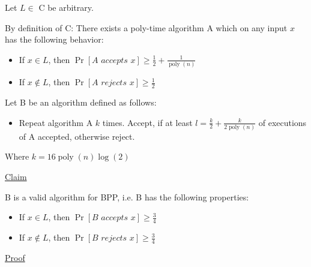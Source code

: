 Let $L \in$ C be arbitrary.

By definition of C: There exists a poly-time algorithm A which on any input $x$ has the following behavior:

\begin{itemize}
    \item If $x \in L$, then $\operatorname{Pr}[\textit{A accepts } x] \geq \frac{1}{2} + \frac{1}{\operatorname{poly}(n)}$
    
    \item If $x \notin L$, then $\operatorname{Pr}[\textit{A rejects } x] \geq \frac{1}{2}$
\end{itemize}

Let B be an algorithm defined as follows:

\begin{itemize}
    \item Repeat algorithm A $k$ times. Accept, if at least $l = \frac{k}{2} + \frac{k}{2 \operatorname{poly}(n)}$ of executions of A accepted, otherwise reject.
\end{itemize}

Where $k = 16\operatorname{poly}(n)\operatorname{log}(2)$

\underline{Claim}

B is a valid algorithm for BPP, i.e. B has the following properties:

\begin{itemize}
    \item If $x \in L$, then $\operatorname{Pr}[\textit{B accepts } x] \geq \frac{3}{4}$
    
    \item If $x \notin L$, then $\operatorname{Pr}[\textit{B rejects } x] \geq \frac{3}{4}$
\end{itemize}

\underline{Proof}

